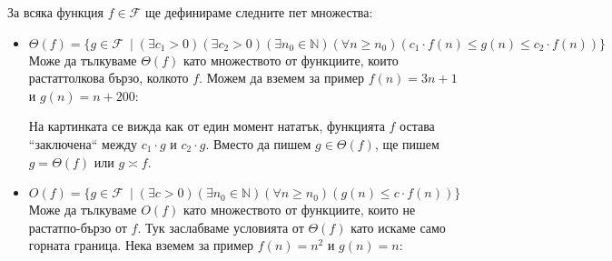 \documentclass{article}
\newcommand{\N}{\mathbb{N}}
\newcommand{\F}{\mathcal{F}}
\theoremstyle{definition}
\theoremstyle{plain}
\theoremstyle{remark}
\theoremstyle{definition}
\begin{document}
За всяка функция $f \in \F$ ще дефинираме следните пет множества:
\begin{itemize}
  \item $\Theta(f) = \{ g \in \F \: \mid (\exists c_1 > 0)(\exists c_2 > 0)(\exists n_0 \in \N)(\forall n \geq n_0)(c_1 \cdot f(n) \leq g(n) \leq c_2 \cdot f(n))\}$ \\
        Може да тълкуваме $\Theta(f)$ като множеството от функциите, които растат\footnotemark[1] толкова бързо, колкото $f$.
        Можем да вземем за пример $f(n) = 3n + 1$ и $g(n) = n + 200$:


        На картинката се вижда как от един момент нататък, функцията $f$ остава ``заключена`` между $c_1 \cdot g$ и $c_2 \cdot g$.
        Вместо да пишем $g \in \Theta(f)$, ще пишем $g = \Theta(f)$ или $g \asymp f$.
  \item $O(f) = \{ g \in \F \: \mid (\exists c > 0)(\exists n_0 \in \N)(\forall n \geq n_0)(g(n) \leq c \cdot f(n))\}$ \\
        Може да тълкуваме $O(f)$ като множеството от функциите, които не растат\footnotemark[1] по-бързо от $f$.
        Тук заслабваме условията от $\Theta(f)$ като искаме само горната граница.
        Нека вземем за пример $f(n) = n^2$ и $g(n) = n$:



\end{itemize}
\end{document}
